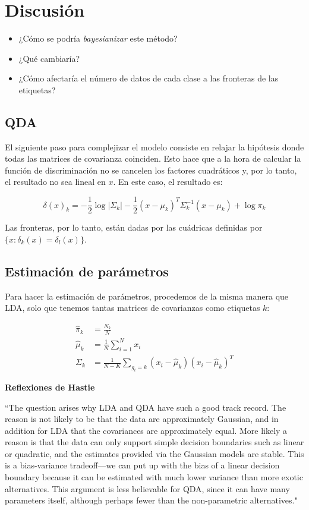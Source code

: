 \documentclass[aps,onecolumn,12pt,notitlepage]{revtex4-1}
\begin{document}
\section*{Discusión}

\begin{itemize}
  \item ¿Cómo se podría \textit{bayesianizar} este método?
  \item ¿Qué cambiaría?
  \item ¿Cómo afectaría el número de datos de cada clase a las fronteras de las etiquetas?
\end{itemize}

\subsection{QDA}

El siguiente paso para complejizar el modelo consiste en relajar la hipótesis donde todas las matrices de covarianza coinciden. Esto hace que a la hora de calcular la función de discriminación no se cancelen los factores cuadráticos y, por lo tanto, el resultado no sea lineal en \(x\). En este caso, el resultado es:

\begin{equation}
\delta(x)_{k} = -\frac{1}{2}\log |\Sigma_{k}| -\frac{1}{2} (x-\mu_{k})^{T}\Sigma_{k}^{-1}(x-\mu_{k}) + \log \pi_{k}
\end{equation}

Las fronteras, por lo tanto, están dadas por las cuádricas definidas por \(\{ x : \delta_{k}(x) = \delta_{l}(x) \}\).

\subsection{Estimación de parámetros}

Para hacer la estimación de parámetros, procedemos de la misma manera que LDA, solo que tenemos tantas matrices de covarianzas como etiquetas \(k\):

\begin{align}
\hat{\pi}_{k} &= \frac{N_{k}}{N} \\
\hat{\mu}_{k} &= \frac{1}{N} \sum_{i=1}^{N} x_{i} \\
\Sigma_{k} &= \frac{1}{N-K} \sum_{g_{i}=k} (x_{i}-\hat{\mu}_{k})(x_{i}-\hat{\mu}_{k})^{T}
\end{align}

\textbf{Reflexiones de Hastie}

``The question arises why LDA and QDA have such a good track record. The reason is not likely to be that the data are approximately Gaussian, and in addition for LDA that the covariances are approximately equal. More likely a reason is that the data can only support simple decision boundaries such as linear or quadratic, and the estimates provided via the Gaussian models are stable. This is a bias-variance tradeoff—we can put up with the bias of a linear decision boundary because it can be estimated with much lower variance than more exotic alternatives. This argument is less believable for QDA, since it can have many parameters itself, although perhaps fewer than the non-parametric alternatives."
\end{document}
